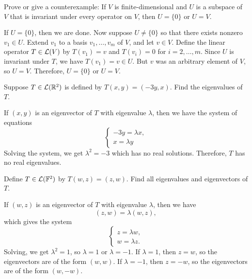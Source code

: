 \begin{exc}
\begin{exercise}
Prove or give a counterexample: If $V$ is finite-dimensional and $U$ is a
subspace of $V$ that is invariant under every operator on $V$, then $U=\{0\}$
or $U=V$.
\end{exercise}
\begin{solution}
If $U=\{0\}$, then we are done. Now suppose $U\ne\{0\}$ so that there exists
nonzero $v_1\in U$. Extend $v_1$ to a basis $v_1,\dots,v_m$ of $V$, and let
$v\in V$. Define the linear operator $T\in\mathcal{L}(V)$ by $T(v_1)=v$ and
$T(v_i)=0$ for $i=2,\dots,m$. Since $U$ is invariant under $T$, we have
$T(v_1)=v\in U$. But $v$ was an arbitrary element of $V$, so $U=V$. Therefore,
$U=\{0\}$ or $U=V$.
\end{solution}

\begin{exercise}
Suppose $T\in\mathcal{L}(\mathbb{R}^2)$ is defined by $T(x,y)=(-3y,x)$. Find the eigenvalues
of $T$.
\end{exercise}
\begin{solution}
If $(x,y)$ is an eigenvector of $T$ with eigenvalue $\lambda$, then we have the
system of equations
\[ \begin{cases} -3y=\lambda x,\\ x=\lambda y \end{cases} \]
Solving the system, we get $\lambda^2=-3$ which has no real solutions.
Therefore, $T$ has no real eigenvalues.
\end{solution}

\begin{exercise}
Define $T\in\mathcal{L}(\mathbb{F}^2)$ by $T(w,z)=(z,w)$. Find all eigenvalues and
eigenvectors of $T$.
\end{exercise}
\begin{solution}
If $(w,z)$ is an eigenvector of $T$ with eigenvalue $\lambda$, then we have
\[ (z,w) = \lambda(w,z), \]
which gives the system
\[ \begin{cases} z=\lambda w,\\ w=\lambda z. \end{cases} \]
Solving, we get $\lambda^2=1$, so $\lambda=1$ or $\lambda=-1$. If $\lambda=1$,
then $z=w$, so the eigenvectors are of the form $(w,w)$. If $\lambda=-1$, then
$z=-w$, so the eigenvectors are of the form $(w,-w)$.
\end{solution}


\end{exc}

